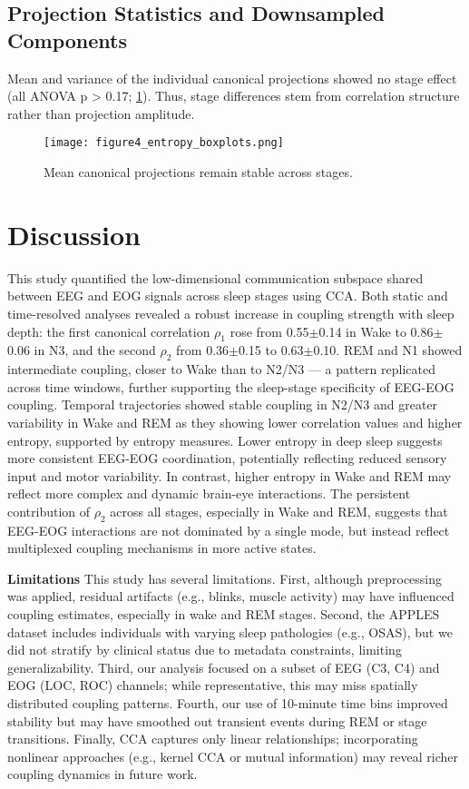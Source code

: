 \subsection{Projection Statistics and Downsampled Components}

Mean and variance of the individual canonical projections showed no stage effect (all ANOVA p > 0.17; \ref{fig:figure4}). Thus, stage differences stem from correlation structure rather than projection amplitude.

\begin{figure}
\centering
\texttt{[image: figure4\_entropy\_boxplots.png]}
\caption{Mean canonical projections remain stable across stages.}\label{fig:figure4}
\end{figure}

\section{Discussion}

This study quantified the low-dimensional communication subspace shared between EEG and EOG signals across sleep stages using CCA. Both static and time-resolved analyses revealed a robust increase in coupling strength with sleep depth: the first canonical correlation $\rho_1$ rose from 0.55$\pm$0.14 in Wake to 0.86$\pm$0.06 in N3, and the second $\rho_2$ from 0.36$\pm$0.15 to 0.63$\pm$0.10. REM and N1 showed intermediate coupling, closer to Wake than to N2/N3 --- a pattern replicated across time windows, further supporting the sleep-stage specificity of EEG-EOG coupling.
Temporal trajectories showed stable coupling in N2/N3 and greater variability in Wake and REM as they showing lower correlation values and higher entropy, supported by entropy measures. Lower entropy in deep sleep suggests more consistent EEG-EOG coordination, potentially reflecting reduced sensory input and motor variability. In contrast, higher entropy in Wake and REM may reflect more complex and dynamic brain-eye interactions. The persistent contribution of $\rho_2$ across all stages, especially in Wake and REM, suggests that EEG-EOG interactions are not dominated by a single mode, but instead reflect multiplexed coupling mechanisms in more active states.

\textbf{Limitations}
This study has several limitations. First, although preprocessing was applied, residual artifacts (e.g., blinks, muscle activity) may have influenced coupling estimates, especially in wake and REM stages. Second, the APPLES dataset includes individuals with varying sleep pathologies (e.g., OSAS), but we did not stratify by clinical status due to metadata constraints, limiting generalizability. Third, our analysis focused on a subset of EEG (C3, C4) and EOG (LOC, ROC) channels; while representative, this may miss spatially distributed coupling patterns. Fourth, our use of 10-minute time bins improved stability but may have smoothed out transient events during REM or stage transitions. Finally, CCA captures only linear relationships; incorporating nonlinear approaches (e.g., kernel CCA or mutual information) may reveal richer coupling dynamics in future work.

